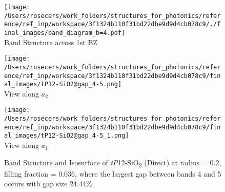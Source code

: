 \begin{figure}[H]
\begin{minipage}{0.5\textwidth}\centering
\texttt{[image: /Users/rosecers/work\_folders/structures\_for\_photonics/reference/ref\_inp/workspace/3f1324b110f31bd22dbe9d9d4cb078c9/./final\_images/band\_diagram\_b=4.pdf]}
\\Band Structure across 1st BZ
\end{minipage}\hfill
\begin{minipage}{0.28\textwidth}\centering
\texttt{[image: /Users/rosecers/work\_folders/structures\_for\_photonics/reference/ref\_inp/workspace/3f1324b110f31bd22dbe9d9d4cb078c9/final\_images/tP12-SiO2@gap\_4-5.png]}
\\View along $a_2$ 
\end{minipage}\hfill
\begin{minipage}{0.2\textwidth}\centering
\texttt{[image: /Users/rosecers/work\_folders/structures\_for\_photonics/reference/ref\_inp/workspace/3f1324b110f31bd22dbe9d9d4cb078c9/final\_images/tP12-SiO2@gap\_4-5\_1.png]}
\\View along $a_1$ 
\end{minipage}\hfill\caption{Band Structure and Isosurface of \textit{tP}12-SiO\textsubscript{2} (Direct) at radius = 0.2, filling fraction = 0.036, where the largest gap between bands 4 and 5 occurs with gap size 24.44\%.}

\end{figure}
\vspace{-0.25in}

